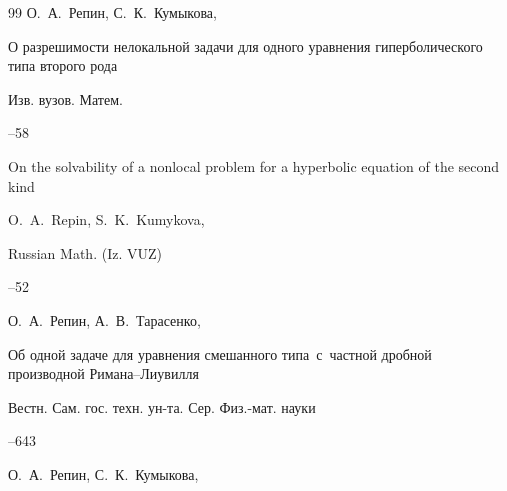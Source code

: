 \begin{thebibliography}{99}
\by О.~А.~Репин, С.~К.~Кумыкова,

\paper О разрешимости нелокальной задачи для одного уравнения гиперболического типа второго рода

\jour Изв. вузов. Матем.



--58


\transl

\paper On the solvability of a nonlocal problem for a hyperbolic equation of the second kind

\by \linebreak O.~A.~Repin,  S.~K.~Kumykova,

\jour Russian Math. (Iz. VUZ)




--52







\by О.~А.~Репин, А.~В.~Тарасенко,

\paper Об одной задаче для уравнения смешанного типа~с~частной дробной производной Римана--Лиувилля

\jour Вестн. Сам. гос. техн. ун-та. Сер. Физ.-мат. науки




--643








\by О.~А.~Репин, С.~К.~Кумыкова,


\end{thebibliography}
